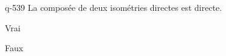 \begin{truefalse}{q-539}
La composée de deux isométries directes est directe.
\item* Vrai
\item Faux
\end{truefalse}

